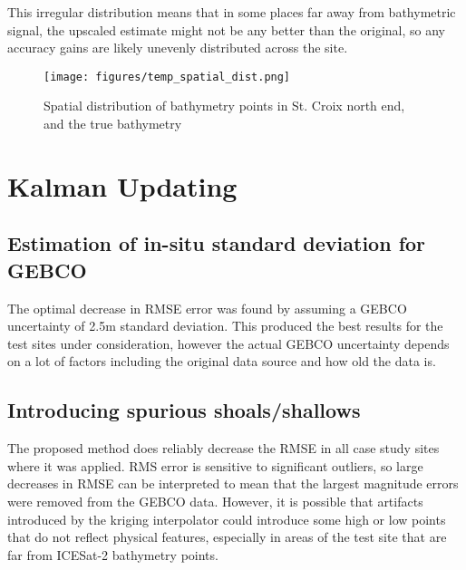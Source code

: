 This irregular distribution means that in some places far away from bathymetric signal, the upscaled estimate might not be any better than the original, so any accuracy gains are likely unevenly distributed across the site. 


\begin{figure}[h!]
    \centering
    \texttt{[image: figures/temp\_spatial\_dist.png]}
    \caption{Spatial distribution of bathymetry points in St. Croix north end, and the true bathymetry}
    \label{fig:distribution-of-bathy-points-in-space}
\end{figure}


\section{Kalman Updating}


\subsection{Estimation of in-situ standard deviation for GEBCO}



The optimal decrease in RMSE error was found by assuming a GEBCO uncertainty of 2.5m standard deviation. This produced the best results for the test sites under consideration, however the actual GEBCO uncertainty depends on a lot of factors including the original data source and how old the data is. 

\subsection{Introducing spurious shoals/shallows}

The proposed method does reliably decrease the RMSE in all case study sites where it was applied. RMS error is sensitive to significant outliers, so large decreases in RMSE can be interpreted to mean that the largest magnitude errors were removed from the GEBCO data. However, it is possible that artifacts introduced by the kriging interpolator could introduce some high or low points that do not reflect physical features, especially in areas of the test site that are far from ICESat-2 bathymetry points.
